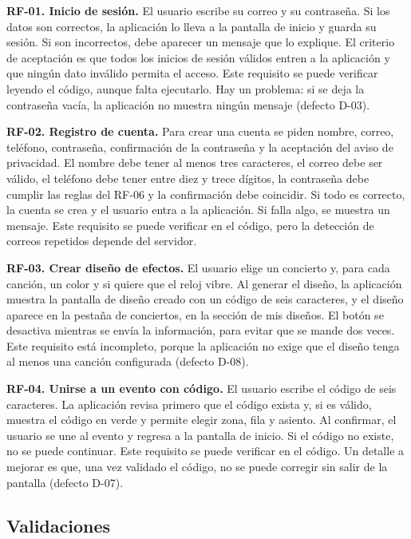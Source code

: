 \documentclass[11pt,a4paper]{article}
\begin{document}
\textbf{RF-01. Inicio de sesión.} El usuario escribe su correo y su contraseña. Si los datos son correctos, la aplicación lo lleva a la pantalla de inicio y guarda su sesión. Si son incorrectos, debe aparecer un mensaje que lo explique. El criterio de aceptación es que todos los inicios de sesión válidos entren a la aplicación y que ningún dato inválido permita el acceso. Este requisito se puede verificar leyendo el código, aunque falta ejecutarlo. Hay un problema: si se deja la contraseña vacía, la aplicación no muestra ningún mensaje (defecto D-03).

\textbf{RF-02. Registro de cuenta.} Para crear una cuenta se piden nombre, correo, teléfono, contraseña, confirmación de la contraseña y la aceptación del aviso de privacidad. El nombre debe tener al menos tres caracteres, el correo debe ser válido, el teléfono debe tener entre diez y trece dígitos, la contraseña debe cumplir las reglas del RF-06 y la confirmación debe coincidir. Si todo es correcto, la cuenta se crea y el usuario entra a la aplicación. Si falla algo, se muestra un mensaje. Este requisito se puede verificar en el código, pero la detección de correos repetidos depende del servidor.

\textbf{RF-03. Crear diseño de efectos.} El usuario elige un concierto y, para cada canción, un color y si quiere que el reloj vibre. Al generar el diseño, la aplicación muestra la pantalla de diseño creado con un código de seis caracteres, y el diseño aparece en la pestaña de conciertos, en la sección de mis diseños. El botón se desactiva mientras se envía la información, para evitar que se mande dos veces. Este requisito está incompleto, porque la aplicación no exige que el diseño tenga al menos una canción configurada (defecto D-08).

\textbf{RF-04. Unirse a un evento con código.} El usuario escribe el código de seis caracteres. La aplicación revisa primero que el código exista y, si es válido, muestra el código en verde y permite elegir zona, fila y asiento. Al confirmar, el usuario se une al evento y regresa a la pantalla de inicio. Si el código no existe, no se puede continuar. Este requisito se puede verificar en el código. Un detalle a mejorar es que, una vez validado el código, no se puede corregir sin salir de la pantalla (defecto D-07).

\subsection*{Validaciones}
\end{document}
